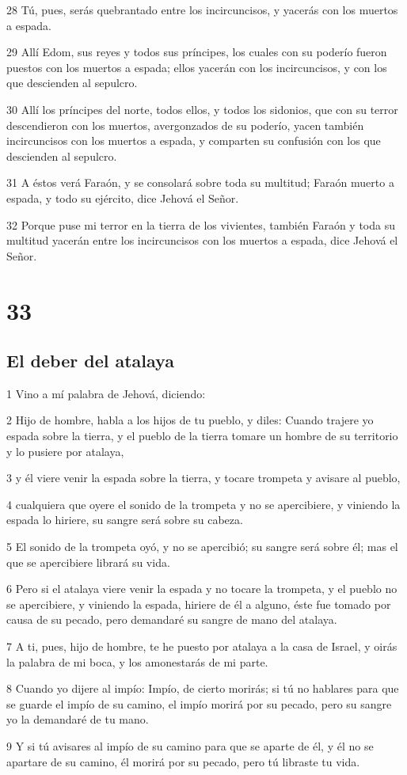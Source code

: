 \par 28 Tú, pues, serás quebrantado entre los incircuncisos, y yacerás con los muertos a espada. 
\par 29 Allí Edom, sus reyes y todos sus príncipes, los cuales con su poderío fueron puestos con los muertos a espada; ellos yacerán con los incircuncisos, y con los que descienden al sepulcro.
\par 30 Allí los príncipes del norte, todos ellos, y todos los sidonios, que con su terror descendieron con los muertos, avergonzados de su poderío, yacen también incircuncisos con los muertos a espada, y comparten su confusión con los que descienden al sepulcro.
\par 31 A éstos verá Faraón, y se consolará sobre toda su multitud; Faraón muerto a espada, y todo su ejército, dice Jehová el Señor.
\par 32 Porque puse mi terror en la tierra de los vivientes, también Faraón y toda su multitud yacerán entre los incircuncisos con los muertos a espada, dice Jehová el Señor. 

\chapter{33}

\section*{El deber del atalaya }

\par 1 Vino a mí palabra de Jehová, diciendo:
\par 2 Hijo de hombre, habla a los hijos de tu pueblo, y diles: Cuando trajere yo espada sobre la tierra, y el pueblo de la tierra tomare un hombre de su territorio y lo pusiere por atalaya,
\par 3 y él viere venir la espada sobre la tierra, y tocare trompeta y avisare al pueblo,
\par 4 cualquiera que oyere el sonido de la trompeta y no se apercibiere, y viniendo la espada lo hiriere, su sangre será sobre su cabeza.
\par 5 El sonido de la trompeta oyó, y no se apercibió; su sangre será sobre él; mas el que se apercibiere librará su vida.
\par 6 Pero si el atalaya viere venir la espada y no tocare la trompeta, y el pueblo no se apercibiere, y viniendo la espada, hiriere de él a alguno, éste fue tomado por causa de su pecado, pero demandaré su sangre de mano del atalaya.
\par 7 A ti, pues, hijo de hombre, te he puesto por atalaya a la casa de Israel, y oirás la palabra de mi boca, y los amonestarás de mi parte.
\par 8 Cuando yo dijere al impío: Impío, de cierto morirás; si tú no hablares para que se guarde el impío de su camino, el impío morirá por su pecado, pero su sangre yo la demandaré de tu mano.
\par 9 Y si tú avisares al impío de su camino para que se aparte de él, y él no se apartare de su camino, él morirá por su pecado, pero tú libraste tu vida.

